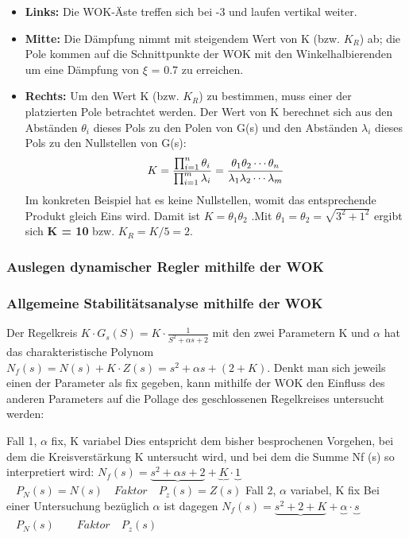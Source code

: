 \begin{multicols}{2}
    \begin{itemize}
    	\item  \textbf{Links:} Die WOK-Äste treffen sich bei -3 und laufen vertikal weiter.
    	\item  \textbf{Mitte:} Die Dämpfung nimmt mit steigendem Wert von K (bzw. $K_R$) ab; die
    	Pole kommen auf die Schnittpunkte der WOK mit den Winkelhalbierenden um eine Dämpfung von $\xi$ = 0.7 zu erreichen.
    	\item  \textbf{Rechts:} Um den Wert K (bzw. $K_R$) zu bestimmen, muss einer der platzierten	Pole betrachtet werden. Der Wert von K berechnet sich aus den Abständen $\theta_i$ dieses Pols zu den Polen von G(s) und den Abständen $\lambda_i$ dieses Pols zu den
    	Nullstellen von G(s): 
        \[
            K=\frac{\prod_{i=1}^{n} \theta_i}{\prod_{i=1}^{m}\lambda_i}=\frac{\theta_1\theta_2\cdots\theta_n}{\lambda_1\lambda_2\cdots\lambda_m} \\
        \]
        Im konkreten Beispiel hat es keine Nullstellen, womit das entsprechende Produkt
    	gleich Eins wird. 	Damit ist $K=\theta_1\theta_2$ .Mit $\theta_1=\theta_2=\sqrt{3^2+1^2}$ ergibt sich \textbf{K = 10} bzw. $K_R = K/5 = 2$.
    \end{itemize}
\end{multicols}


\subsubsection{Auslegen dynamischer Regler mithilfe der WOK }


\subsubsection{Allgemeine Stabilitätsanalyse mithilfe der WOK }
Der Regelkreis $K\cdot G_s(S)=K\cdot\frac{1}{S^2+\alpha s + 2}$ mit den zwei Parametern K und $\alpha$ hat das charakteristische
Polynom $N_f(s)=N(s) + K\cdot Z(s) = s^2 + \alpha s + (2 + K)$. Denkt man sich jeweils einen der
Parameter als fix gegeben, kann mithilfe der WOK den Einfluss des anderen Parameters
auf die Pollage des geschlossenen Regelkreises untersucht werden:

Fall 1, $\alpha$ fix, K variabel
Dies entspricht dem bisher besprochenen Vorgehen, bei dem die Kreisverstärkung
K untersucht wird, und bei dem die Summe Nf (s) so interpretiert wird:
$N_f(s)=\underbrace{s^2+\alpha s + 2} +\underbrace{K}\cdot\underbrace{1} $\\
\textcolor{white}{x} \hspace{12.25cm} $P_N(s)=N(s) \quad Faktor  \quad P_z(s)=Z(s)$
Fall 2, $\alpha$ variabel, K fix Bei einer Untersuchung bezüglich $\alpha$ ist dagegen
$N_f(s)=\underbrace{s^2+ 2 + K} +\underbrace{\alpha}\cdot\underbrace{s} $\\
\textcolor{white}{x} \hspace{13.5cm} $P_N(s) \qquad Faktor  \quad P_z(s)$
